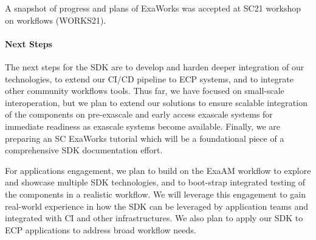 A snapshot of progress and plans of ExaWorks was accepted at SC21 workshop on
workflows (WORKS21).



\paragraph{Next Steps}


The next steps for the SDK are to develop and harden deeper integration of our
technologies, to extend our CI/CD pipeline to ECP systems, and to integrate
other community workflows tools. Thus far, we have focused on small-scale
interoperation, but we plan to extend our solutions to ensure scalable
integration of the components on pre-exascale and early access exascale
systems for immediate readiness as exascale systems become available. Finally,
we are preparing an SC ExaWorks tutorial which will be a foundational piece of
a comprehensive SDK documentation effort.

For applications engagement, we plan to build on the ExaAM workflow to explore
and showcase multiple SDK technologies, and to boot-strap integrated testing of
the components in a realistic workflow. We will leverage this engagement to
gain real-world experience in how the SDK can be leveraged by application teams
and integrated with CI and other infrastructures.  We also plan to apply our
SDK to ECP applications to address broad workflow needs.
